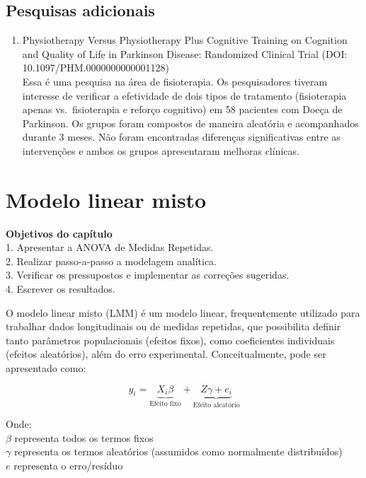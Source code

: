 \documentclass[
]{book}
\providecommand{\tightlist}{%
  \setlength{\itemsep}{0pt}\setlength{\parskip}{0pt}}
\newenvironment{objectives}{
  \definecolor{shadecolor}{rgb}{0.764,0.992,0.686}  %
  \color{black}
  \begin{shaded}}
 {\end{shaded}}
\begin{document}
\hypertarget{pesquisas-adicionais-5}{%
\section{Pesquisas adicionais}\label{pesquisas-adicionais-5}}

\begin{enumerate}
\def\labelenumi{\arabic{enumi}.}
\tightlist
\item
  Physiotherapy Versus Physiotherapy Plus Cognitive Training on Cognition and Quality of Life in Parkinson Disease: Randomized Clinical Trial (DOI: 10.1097/PHM.0000000000001128)\\
  Essa é uma pesquisa na área de fisioterapia. Os pesquisadores tiveram interesse de verificar a efetividade de dois tipos de tratamento (fisioterapia apenas vs.~fisioterapia e reforço cognitivo) em 58 pacientes com Doeça de Parkinson. Os grupos foram compostos de maneira aleatória e acompanhados durante 3 meses. Não foram encontradas diferenças significativas entre as intervenções e ambos os grupos apresentaram melhoras clínicas.
\end{enumerate}

\hypertarget{modelo-linear-misto}{%
\chapter{Modelo linear misto}\label{modelo-linear-misto}}

\begin{objectives}
\textbf{Objetivos do capítulo}\\
1. Apresentar a ANOVA de Medidas Repetidas.\\
2. Realizar passo-a-passo a modelagem analítica.\\
3. Verificar os pressupostos e implementar as correções sugeridas.\\
4. Escrever os resultados.

\end{objectives}

O modelo linear misto (LMM) é um modelo linear, frequentemente utilizado para trabalhar dados longitudinais ou de medidas repetidas, que possibilita definir tanto parâmetros populacionais (efeitos fixos), como coeficientes individuais (efeitos aleatórios), além do erro experimental. Conceitualmente, pode ser apresentado como:

\[y_i = \underbrace{X_i\beta}_\text{Efeito fixo} + \underbrace{Z\gamma + e_i}_\text{Efeito aleatório}\]

Onde:\\
\(\beta\) representa todos os termos fixos\\
\(\gamma\) representa os termos aleatórios (assumidos como normalmente distribuídos)\\
\(e\) representa o erro/resíduo
\end{document}
